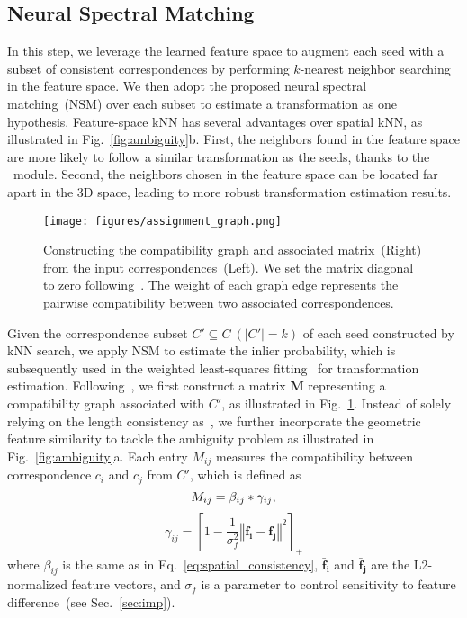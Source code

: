 \subsection{Neural Spectral Matching}
\label{subsec:nsm}
In this step, we leverage the learned feature space to augment each seed with {a subset of} consistent correspondences by performing $k$-nearest neighbor searching in the feature space.  
We then adopt {the proposed }neural spectral matching~(NSM)
over each subset to estimate {a} transformation as one hypothesis. Feature-space kNN has several advantages over spatial kNN, as illustrated in Fig.~\ref{fig:ambiguity}b. 
First, {the} neighbors found in the feature space are more likely to follow a similar transformation as the seeds, thanks to the \nonlocal~module. Second, the neighbors chosen in {the} feature space can be located far apart in {the} 3D space,
leading to more robust {transformation} estimation results. 

\begin{figure}[tb]
\setlength{\belowcaptionskip}{-0.35cm}
	\centering
	\vspace{-0.5cm}
    \texttt{[image: figures/assignment\_graph.png]}
    \caption{Constructing the compatibility graph {and associated matrix~(Right)} from the input correspondences~(Left). We set the matrix diagonal to zero following~\cite{leordeanu2005spectral}.
The weight of each graph edge represents the pairwise compatibility between two {associated} correspondences. } 
    \label{fig:assignment_graph}
\end{figure}

Given the correspondence subset $C' \subseteq C~(|C'|=k)$ of each seed constructed by kNN search, we apply NSM to estimate the inlier probability, which is subsequently used in the weighted least-squares
fitting~\cite{besl1992method} for transformation estimation.  Following~\cite{leordeanu2005spectral}, we first construct a matrix $\mathbf{M}$ representing a compatibility graph associated with $C'$, 
as illustrated in Fig.~\ref{fig:assignment_graph}. Instead of solely relying on the length consistency as~\cite{leordeanu2005spectral}, {we further incorporate the geometric feature similarity to tackle the ambiguity problem}
as illustrated in Fig.~\ref{fig:ambiguity}a. Each entry ${M_{ij}}$ measures the compatibility between correspondence $c_i$ and $c_j$ from $C'$, which is defined as 
\begin{equation}
\setlength\abovedisplayskip{5pt}
\setlength\belowdisplayskip{5pt}
    M_{ij} = \beta_{ij} * \gamma_{ij},
\label{eq:compatibility}
\end{equation}
\begin{equation}
\gamma_{ij} = [1 - \frac{1}{\sigma_f^2}  \left\Vert \bm{\bar f_i - \bar f_j} \right\Vert^2]_+
     \label{eq:feat_sm}
\end{equation}
where $\beta_{ij}$ is {the same as} in Eq.~\ref{eq:spatial_consistency},
$\bm{\bar f_i}$ and $\bm{\bar f_j}$ are the L2-normalized feature vectors, and $\sigma_f$ is a parameter to control sensitivity to {feature difference~(see Sec.~\ref{sec:imp}).} 


